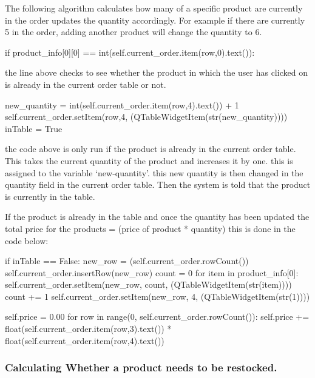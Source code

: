 \begin{python}
The following algorithm calculates how many of a specific product are currently in the order updates the quantity accordingly. For example if there are currently 5 in the order, adding another product will change the quantity to 6.


\begin{python}
if product_info[0][0] == int(self.current_order.item(row,0).text()):
\end{python}

the line above checks to see whether the product in which the user has clicked on is already in the current order table or not.

\begin{python}
new_quantity = int(self.current_order.item(row,4).text()) + 1
self.current_order.setItem(row,4, (QTableWidgetItem(str(new_quantity))))
inTable  = True
\end{python}

the code above is only run if the product is already in the current order table. This takes the current quantity of the product and increases it by one. this is assigned to the variable `new-quantity'. this new quantity is then changed in the quantity field in the current order table. Then the system is told that the product is currently in the table.

If the product is already in the table and once the quantity has been updated the total price for the products = (price of product * quantity) this is done in the code below:

\begin{python}
if inTable == False:
            new_row = (self.current_order.rowCount())
            self.current_order.insertRow(new_row)
            count = 0
            for item in product_info[0]:
                self.current_order.setItem(new_row, count, (QTableWidgetItem(str(item))))
                count += 1
            self.current_order.setItem(new_row, 4, (QTableWidgetItem(str(1))))

        self.price = 0.00
        for row in range(0, self.current_order.rowCount()):
            self.price += float(self.current_order.item(row,3).text()) * float(self.current_order.item(row,4).text())
\end{python}

\pagebreak

\subsubsection{Calculating Whether a product needs to be restocked.}


\end{python}
